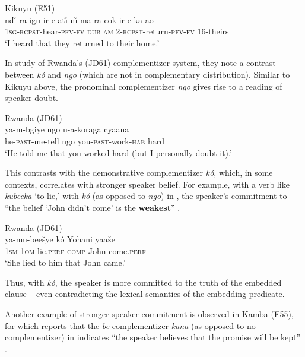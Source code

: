 \documentclass[output=paper,colorlinks,citecolor=brown,
]{langscibook}
\begin{document}
\ea Kikuyu (E51) \citep[114]{Kihara:2017} \\
\gll nd{\~\i}-ra-igu-ir-e at{\~\i} n{\~\i} ma-ra-cok-ir-e ka-ao\\
1\textsc{sg}-\textsc{rcpst}-hear-\textsc{pfv}-\textsc{fv} \textsc{dub} \textsc{am} 2-\textsc{rcpst}-return-\textsc{pfv}-\textsc{fv} 16-theirs\\
\glt `I heard that they returned to their home.' 
 \z

In   study of Rwanda's (JD61) complementizer system, they note a contrast between \textit{k\'o} and \textit{ngo} (which are not in complementary distribution). Similar to Kikuyu above, the pronominal complementizer \textit{ngo} gives rise to a reading of speaker-doubt.

\ea Rwanda (JD61) \citep[96]{GivonKimenyi:1974} \\
	\gll ya-m-bgiye ngo u-a-koraga cyaana\\
	he-\textsc{past}-me-tell ngo you-\textsc{past}-work-\textsc{hab} hard\\
	\glt `He told me that you worked hard (but I personally doubt it).'
\z

This contrasts with the demonstrative complementizer \textit{k\'o}, which, in some contexts, correlates  with stronger speaker belief. For example, with a verb like \textit{kubeeka} `to lie,' with \textit{k\'o} (as opposed to \textit{ngo}) in , the speaker's commitment to ``the belief `John didn't come' is the \textbf{weakest}'' \citep[102, emphasis in original]{GivonKimenyi:1974}. 

\ea\label{ex:gluckman:kin.ko.evid} Rwanda (JD61) \citep[102]{GivonKimenyi:1974} \\
\gll ya-mu-bee\v{s}ye k\'o Yohani yaa\v{z}e\\
1\textsc{sm}-\textsc{1om}-lie.\textsc{perf} \textsc{comp} John come.\textsc{perf}\\
\glt `She lied to him that John came.' 
\z

Thus, with \textit{k\'o}, the speaker is more committed to the truth of the embedded clause -- even contradicting the lexical semantics of the embedding predicate. 

Another example of stronger speaker commitment is observed in Kamba (E55), for which \citet{Myers:1975} reports that the \textit{be}-complementizer \textit{kana} (as opposed to no complementizer) in  indicates ``the speaker believes that the promise will be kept'' \citep[190]{Myers:1975}.
\end{document}
